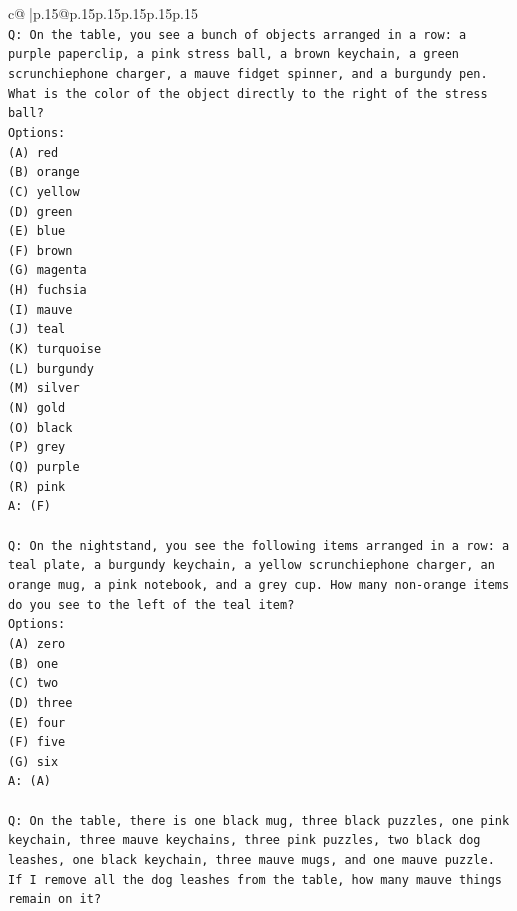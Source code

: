 \documentclass{article}
\begin{document}
{\begin{supertabular}{c@{$\;$}|p{.15\linewidth}@{}p{.15\linewidth}p{.15\linewidth}p{.15\linewidth}p{.15\linewidth}p{.15\linewidth}}
{{{\\ 
\texttt{Q: On the table, you see a bunch of objects arranged in a row: a purple paperclip, a pink stress ball, a brown keychain, a green scrunchiephone charger, a mauve fidget spinner, and a burgundy pen. What is the color of the object directly to the right of the stress ball?} \\
\texttt{Options:} \\
\texttt{(A) red} \\
\texttt{(B) orange} \\
\texttt{(C) yellow} \\
\texttt{(D) green} \\
\texttt{(E) blue} \\
\texttt{(F) brown} \\
\texttt{(G) magenta} \\
\texttt{(H) fuchsia} \\
\texttt{(I) mauve} \\
\texttt{(J) teal} \\
\texttt{(K) turquoise} \\
\texttt{(L) burgundy} \\
\texttt{(M) silver} \\
\texttt{(N) gold} \\
\texttt{(O) black} \\
\texttt{(P) grey} \\
\texttt{(Q) purple} \\
\texttt{(R) pink} \\
\texttt{A: (F)} \\
\\ 
\texttt{Q: On the nightstand, you see the following items arranged in a row: a teal plate, a burgundy keychain, a yellow scrunchiephone charger, an orange mug, a pink notebook, and a grey cup. How many non{-}orange items do you see to the left of the teal item?} \\
\texttt{Options:} \\
\texttt{(A) zero} \\
\texttt{(B) one} \\
\texttt{(C) two} \\
\texttt{(D) three} \\
\texttt{(E) four} \\
\texttt{(F) five} \\
\texttt{(G) six} \\
\texttt{A: (A)} \\
\\ 
\texttt{Q: On the table, there is one black mug, three black puzzles, one pink keychain, three mauve keychains, three pink puzzles, two black dog leashes, one black keychain, three mauve mugs, and one mauve puzzle. If I remove all the dog leashes from the table, how many mauve things remain on it?} \\
}}}
\end{supertabular}}
\end{document}
